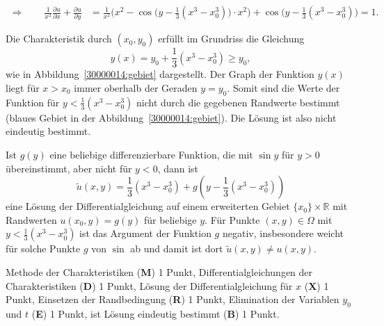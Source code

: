 \begin{loesung}
\begin{teilaufgaben}
\begin{align*}
\Rightarrow
\qquad
\frac1{x^2}
\frac{\partial u}{\partial x}
+
\frac{\partial u}{\partial y}
&=
\frac1{x^2}\biggl(x^2 -
\cos\bigl(y-{\textstyle\frac13}(x^3-x_0^3)\bigr)
\cdot x^2\biggr)
+
\cos\bigl(y-{\textstyle\frac13}(x^3-x_0^3)\bigr)
=1.
\end{align*}
\item
Die Charakteristik durch $(x_0,y_0)$ erfüllt im Grundriss die Gleichung
\[
y(x)
=
y_0 + {\textstyle\frac13}(x^3-x_0^3)
\ge
y_0,
\]
wie in Abbildung~\ref{30000014:gebiet} dargestellt.
Der Graph der Funktion $y(x)$ liegt für $x>x_0$ immer oberhalb der
Geraden $y=y_0$.
Somit sind die Werte der Funktion für $y < {\textstyle\frac13}(x^3-x_0^3)$
nicht durch die gegebenen Randwerte bestimmt (blaues Gebiet in der
Abbildung~\ref{30000014:gebiet}).
Die Lösung ist also nicht eindeutig bestimmt.
\qedhere
\end{teilaufgaben}
\end{loesung}

\begin{diskussion}
Ist $g(y)$ eine beliebige differenzierbare Funktion, die mit $\sin y$ 
für $y>0$ übereinstimmt, aber nicht für $y<0$, dann ist
\[
\tilde u(x,y) = {\textstyle\frac13}(x^3-x_0^3) + g(y-{\textstyle\frac13}(x^3-x_0^3))
\]
eine Lösung der Differentialgleichung auf einem erweiterten Gebiet
$\{x_0\}\times \mathbb R$ mit Randwerten $u(x_0,y)=g(y)$ für beliebige $y$.
Für Punkte $(x,y)\in\Omega$ mit $y<{\textstyle\frac13}(x^3-x_0^3)$
ist das Argument
der Funktion $g$ negativ, insbesondere weicht für solche Punkte $g$ von
$\sin$ ab und damit ist dort $\tilde u(x,y)\ne u(x,y)$.
\end{diskussion}

\begin{bewertung}
Methode der Charakteristiken ({\bf M}) 1 Punkt,
Differentialgleichungen der Charakteristiken ({\bf D}) 1 Punkt,
Lösung der Differentialgleichung für $x$ ({\bf X}) 1 Punkt,
Einsetzen der Randbedingung ({\bf R}) 1 Punkt,
Elimination der Variablen $y_0$ und $t$ ({\bf E}) 1 Punkt,
ist Lösung eindeutig bestimmt ({\bf B}) 1 Punkt.
\end{bewertung}



